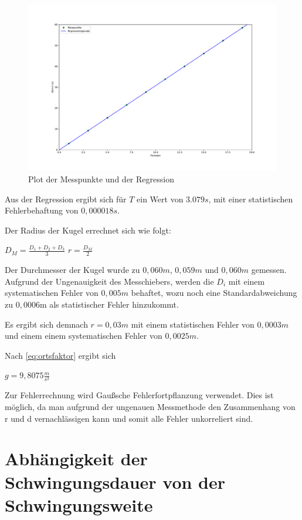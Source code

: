 \begin{figure}[h!]
    \centering
    \includegraphics[scale=0.4]{./Pendel/Protokoll/fig/Fadenpendel_Regression.pdf}
    \caption{Plot der Messpunkte und der Regression}
    \label{fig:Faden_Reg1}
\end{figure}

Aus der Regression ergibt sich für $T$ ein Wert von $3.079s$, mit einer statistischen Fehlerbehaftung von $0,000018s$.

Der Radius der Kugel errechnet sich wie folgt:

$D_M = \frac{D_1 + D_2 + D_3}{3}$
$r = \frac{D_M}{2}$

Der Durchmesser der Kugel wurde zu $0,060m$, $0,059m$ und $0,060m$ gemessen.
Aufgrund der Ungenauigkeit des Messchiebers, werden die $D_i$ mit einem systematischen Fehler von $0,005m$ behaftet, wozu noch eine Standardabweichung zu $0,0006$m als statistischer Fehler hinzukommt.

Es ergibt sich demnach $r = 0,03m$ mit einem statistischen Fehler von $0,0003m$ und einem einem systematischen Fehler von $0,0025m$.

Nach \ref{eq:ortsfaktor} ergibt sich

$g = 9,8075\frac{m}{s^2}$

Zur Fehlerrechnung wird Gaußsche Fehlerfortpflanzung verwendet. Dies ist möglich, da man aufgrund der ungenauen Messmethode den Zusammenhang von r und d vernachlässigen kann und somit alle Fehler unkorreliert sind.

\section{Abhängigkeit der Schwingungsdauer von der Schwingungsweite}

